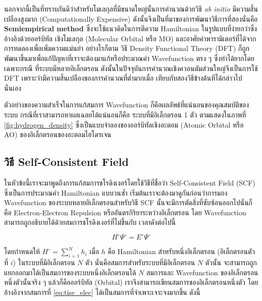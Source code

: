 นอกจากนี้เป็นที่ทราบกันดีว่าสำหรับโมเลกุลที่มีขนาดใหญ่นั้นการคำนวณด้วยวิธี \textit{ab initio} มีความสิ้นเปลืองสูงมาก (Computationally 
Expensive)\autocite{grabowski2011} ดังนั้นจึงเป็นที่มาของการพัฒนาวิธีการที่สองนั่นคือ \textbf{Semiempirical method}%
\autocite{thiel2014,christensen2016,kriz2020} ซึ่งจะใช้แนวคิดในการตีความ Hamiltonian ในรูปแบบที่ง่ายกว่าซึ่งอ้างอิงด้วยออร์บิทัล%
เชิงโมเลกุล (Molecular Orbital หรือ MO) และอาศัยค่าพารามิเตอร์ที่ได้จากการทดลองเพื่อเพิ่มความแม่นยำ อย่างไรก็ตาม วิธี Density 
Functional Theory (DFT) ก็ถูกพัฒนาขึ้นมาเพื่อแก้ปัญหาที่เราจะต้องมาแก้หรือประมาณค่า Wavefunction ตรง ๆ ซึ่งทำได้ยากโดยเฉพาะกรณี%
ที่ระบบมีหลายอิเล็กตรอน ดังนั้นในปัจจุบันการคำนวณเชิงควอนตัมส่วนใหญ่จึงเป็นการใช้ DFT เพราะว่ามีความสิ้นเปลืองของการคำนวณที่ต่ำมากเมื่อ%
เทียบกับสองวิธีข้างต้นทีได้กล่าวไปนั่นเอง

ตัวอย่างของความสำเร็จในการแก้สมการ Wavefunction ก็คือผลลัพธ์ที่แน่นอนของคุณสมบัติของระบบ กรณีที่เราสามารถหาผลเฉลยได้แน่นอนก็คือ%
ระบบที่มีอิเล็กตรอน 1 ตัว ตามแสดงในภาพที่ \ref{fig:hydrogen_density} ซึ่งเป็นแบบจำลองของออร์บิทัลเชิงอะตอม (Atomic Orbital 
หรือ AO) ของอิเล็กตรอนของอะตอมไฮโดรเจน

\subsection{วิธี Self-Consistent Field}
\label{ssec:scf}

ในหัวข้อนี้เราจะมาพูดถึงการแก้สมการชโรดิงเงอร์โดยใช้วิธีที่ชื่อว่า Self-Consistent Field (SCF) ซึ่งเป็นการประมาณค่า Hamiltonian 
แบบวนซ้ำ เริ่มต้นเราจะต้องมาดูกันก่อนว่าการมอง Wavefunction ของระบบหลายอิเล็กตรอนสำหรับวิธี SCF นั้นจะมีการตัดสิ่งที่ซับซ้อนออกไปนั่นก็คือ
Electron-Electron Repulsion หรืออันตรกิริยาระหว่างอิเล็กตรอน โดย Wavefunction สามารถถูกอธิบายได้ด้วยสมการชโรดิงเงอร์ที่ไม่ขึ้นกับ%
เวลาดังต่อไปนี้\autocite{cramer2004}

\begin{equation}\label{eq:tise_elec}
    H^{\circ} \Psi^{\circ} = E^{\circ} \Psi^{\circ}
\end{equation}

โดยกำหนดให้ $H^{\circ} = \sum^{N}_{i=1} h_{i}$ เมื่อ $h$ คือ Hamiltonian สำหรับหนึ่งอิเล็กตรอน (อิเล็กตรอนตัวที่ $i$) 
ในระบบที่มีอิเล็กตรอน $N$ ตัว นั่นคือสมการสำหรับระบบที่มีอิเล็กตรอน $N$ ตัวนั้น จะสามารถถูกแยกออกมาได้เป็นสมการของระบบหนึ่งอิเล็กตรอนได้ 
$N$ สมการและ Wavefunction ของอิเล็กตรอนหนึ่งตัวนั้นจริง ๆ แล้วก็คือออร์บิทัล (Orbital) เราจึงสามารถเขียนสมการของอิเล็กตรอนหนึ่งตัว%
โดยอ้างอิงจากสมการที่ \ref{eq:tise_elec} ได้เป็นสมการที่จำเพาะเจาะจงมากขึ้น ดังนี้


